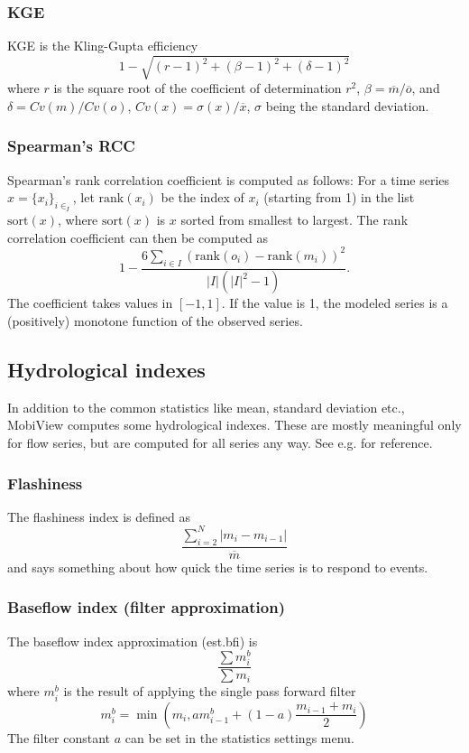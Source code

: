 \documentclass[11pt]{article}
\theoremstyle{definition}
\begin{document}
\subsubsection{KGE}
KGE is the Kling-Gupta efficiency \cite{klinggupta09}
\[
1 - \sqrt{(r-1)^2 + (\beta-1)^2 + (\delta-1)^2}
\]
where $r$ is the square root of the coefficient of determination $r^2$, $\beta=\overline{m}/\overline{o}$, and $\delta=Cv(m)/Cv(o)$, $Cv(x)=\sigma(x)/\overline{x}$, $\sigma$ being the standard deviation.

\subsubsection{Spearman's RCC}
Spearman's rank correlation coefficient \cite{spearman04} is computed as follows: For a time series $x=\{x_i\}_{i\in_I}$, let $\mathrm{rank}(x_i)$ be the index of $x_i$ (starting from 1) in the list $\mathrm{sort}(x)$, where $\mathrm{sort}(x)$ is $x$ sorted from smallest to largest. The rank correlation coefficient can then be computed as
\[
1 - \frac{6\sum_{i\in I}(\mathrm{rank}(o_i)-\mathrm{rank}(m_i))^2}{|I|(|I|^2 - 1)}.
\]
The coefficient takes values in $[-1, 1]$. If the value is 1, the modeled series is a (positively) monotone function of the observed series.

\subsection{Hydrological indexes}

In addition to the common statistics like mean, standard deviation etc., MobiView computes some hydrological indexes. These are mostly meaningful only for flow series, but are computed for all series any way. See e.g. \cite{fenicia-et-al18} for reference.

\subsubsection{Flashiness}

The flashiness index is defined as
\[
\frac{\sum_{i=2}^N|m_i-m_{i-1}|}{\overline{m}}
\]
and says something about how quick the time series is to respond to events.

\subsubsection{Baseflow index (filter approximation)}

The baseflow index approximation (est.bfi) is
\[
\frac{\sum{m_i^b}}{\sum{m_i}}
\]
where $m_i^b$ is the result of applying the single pass forward filter
\[
m_i^b = \min(m_i, am_{i-1}^b + (1-a)\frac{m_{i-1}+m_i}{2})
\]
The filter constant $a$ can be set in the statistics settings menu.
\end{document}

